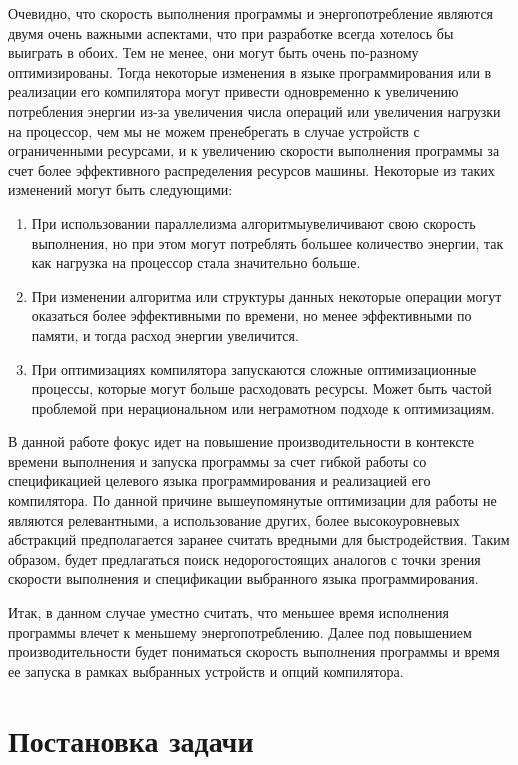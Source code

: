 \documentclass{mipt-thesis-bs}
\begin{document}
Очевидно, что скорость выполнения программы и энергопотребление являются двумя очень важными
аспектами, что при разработке всегда хотелось бы выиграть в обоих. Тем не менее, они могут
быть очень по-разному оптимизированы. Тогда некоторые изменения в языке программирования или
в реализации его компилятора могут привести одновременно к увеличению потребления энергии из-за
увеличения числа операций или увеличения нагрузки на процессор, чем мы
не можем пренебрегать в случае устройств с ограниченными ресурсами, и к увеличению скорости выполнения
программы за счет более эффективного распределения ресурсов машины. Некоторые из таких
изменений могут быть следующими:

\begin{enumerate}
    \item При использовании параллелизма алгоритмыувеличивают свою скорость выполнения, но при этом
    могут потреблять большее количество энергии, так как нагрузка на процессор стала
    значительно больше.
    \item При изменении алгоритма или структуры данных некоторые операции могут оказаться
    более эффективными по времени, но менее эффективными по памяти, и тогда расход
    энергии увеличится.
    \item При оптимизациях компилятора запускаются сложные оптимизационные процессы, которые
    могут больше расходовать ресурсы. Может быть частой проблемой при нерациональном или
    неграмотном подходе к оптимизациям.
\end{enumerate}

В данной работе фокус идет на повышение производительности в контексте времени выполнения и
запуска программы за счет гибкой работы со спецификацией целевого языка программирования и
реализацией его компилятора. По данной причине вышеупомянутые оптимизации для работы не являются
релевантными, а использование других, более высокоуровневых абстракций предполагается заранее считать
вредными для быстродействия. Таким образом, будет предлагаться поиск недорогостоящих аналогов
с точки зрения скорости выполнения и спецификации выбранного языка программирования.

Итак, в данном случае уместно считать, что меньшее время исполнения программы
влечет к меньшему энергопотреблению. Далее под повышением производительности будет пониматься скорость выполнения
программы и время ее запуска в рамках выбранных устройств и опций компилятора.
\chapter{Постановка задачи}
\end{document}
